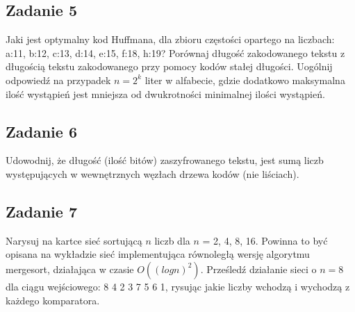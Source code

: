 \documentclass{article}
\begin{document}
\subsection*{Zadanie 5}
Jaki jest optymalny kod Huffmana, dla zbioru częstości opartego na liczbach: a:11, b:12,
c:13, d:14, e:15, f:18, h:19? Porównaj długość zakodowanego tekstu z długością tekstu
zakodowanego przy pomocy kodów stałej długości.
Uogólnij odpowiedź na przypadek $n = 2^k$ liter w alfabecie, gdzie dodatkowo maksymalna
ilość wystąpień jest mniejsza od dwukrotności minimalnej ilości wystąpień.

\subsection*{Zadanie 6}
Udowodnij, że długość (ilość bitów) zaszyfrowanego tekstu, jest sumą liczb występujących w
wewnętrznych węzłach drzewa kodów (nie liściach).

\subsection*{Zadanie 7}
Narysuj na kartce sieć sortującą $n$ liczb dla $n$ = 2, 4, 8, 16. Powinna to być opisana na
wykładzie sieć implementująca równoległą wersję algorytmu mergesort, działająca w
czasie $O((log n)^2)$. Prześledź działanie sieci o $n = 8$ dla ciągu wejściowego: 8 4 2 3 7 5 6
1, rysując jakie liczby wchodzą i wychodzą z każdego komparatora.
\end{document}
